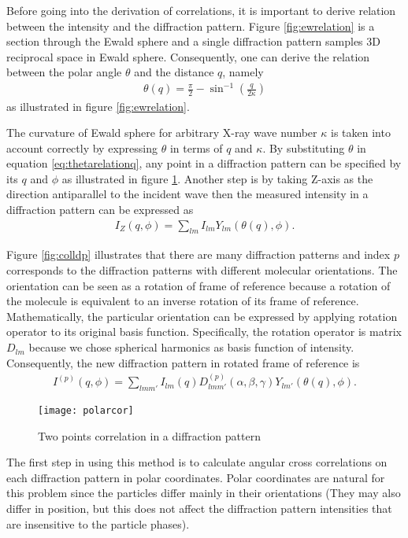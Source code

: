 Before going into the derivation of correlations, it is important to derive relation between the intensity and the diffraction pattern. Figure \ref{fig:ewrelation} is a section through the Ewald sphere and a single diffraction pattern samples 3D reciprocal space in Ewald sphere. Consequently, one can derive the relation between the polar angle $\theta$ and the distance $q$, namely 
\begin{eqnarray}
\theta(q) = \frac{\pi}{2} - \sin ^{-1}(\frac{q}{2 \kappa})
\label{eq:thetarelationq}
\end{eqnarray}
as illustrated in figure \ref{fig:ewrelation}.

The curvature of Ewald sphere for arbitrary X-ray wave number $\kappa$ is taken into account correctly by expressing $\theta$ in terms of $q$ and $\kappa$. By substituting $\theta$ in equation \ref{eq:thetarelationq}, any point in a diffraction pattern can be specified by its $q$ and $\phi$ as illustrated in figure \ref{fig:polarcor}. Another step is by taking Z-axis as the direction antiparallel to the incident wave then the measured intensity in a diffraction pattern can be expressed as
\begin{eqnarray}
I_{Z}(q,\phi)=\sum_{lm} I_{lm} Y_{lm}(\theta(q),\phi).
\end{eqnarray} 

Figure \ref{fig:colldp} illustrates that there are many diffraction patterns and index $p$ corresponds to the diffraction patterns with different molecular orientations. The orientation can be seen as a rotation of frame of reference because a rotation of the molecule is equivalent to an inverse rotation of its frame of reference. Mathematically, the particular orientation can be expressed by applying rotation operator to its original basis function. Specifically, the rotation operator is matrix $D_{lm}$ because we chose spherical harmonics as basis function of intensity. Consequently, the new diffraction pattern in rotated frame of reference is  
\begin{eqnarray}
I^{(p)}(q,\phi)=\sum_{lmm'}I_{lm}(q) D^{(p)}_{lmm'}(\alpha,\beta,\gamma) Y_{lm'}(\theta(q),\phi).
\label{Idiffrot}
\end{eqnarray}

\begin{figure}[ht]
  \centering
  \texttt{[image: polarcor]}
\caption{Two points correlation in a diffraction pattern}
\label{fig:polarcor}
\end{figure}

The first step in using this method is to calculate angular cross correlations on each diffraction pattern  in polar coordinates. Polar coordinates are natural for this problem since the particles differ mainly in their orientations (They may also differ in position, but this does not affect the diffraction pattern intensities that are insensitive to the particle phases).

